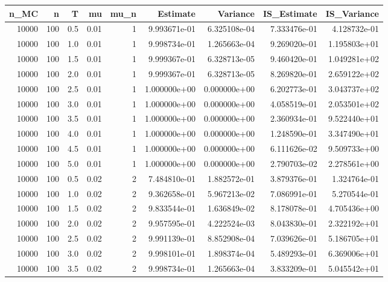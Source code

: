 \begin{tabular}{rrrrrrrrr}
\toprule
  n\_MC &    n &    T &    mu &  mu\_n &      Estimate &      Variance &   IS\_Estimate &   IS\_Variance \\
\midrule
 10000 &  100 &  0.5 &  0.01 &     1 &  9.993671e-01 &  6.325108e-04 &  7.333476e-01 &  4.128732e-01 \\
 10000 &  100 &  1.0 &  0.01 &     1 &  9.998734e-01 &  1.265663e-04 &  9.269020e-01 &  1.195803e+01 \\
 10000 &  100 &  1.5 &  0.01 &     1 &  9.999367e-01 &  6.328713e-05 &  9.460420e-01 &  1.049281e+02 \\
 10000 &  100 &  2.0 &  0.01 &     1 &  9.999367e-01 &  6.328713e-05 &  8.269820e-01 &  2.659122e+02 \\
 10000 &  100 &  2.5 &  0.01 &     1 &  1.000000e+00 &  0.000000e+00 &  6.202773e-01 &  3.043737e+02 \\
 10000 &  100 &  3.0 &  0.01 &     1 &  1.000000e+00 &  0.000000e+00 &  4.058519e-01 &  2.053501e+02 \\
 10000 &  100 &  3.5 &  0.01 &     1 &  1.000000e+00 &  0.000000e+00 &  2.360934e-01 &  9.522440e+01 \\
 10000 &  100 &  4.0 &  0.01 &     1 &  1.000000e+00 &  0.000000e+00 &  1.248590e-01 &  3.347490e+01 \\
 10000 &  100 &  4.5 &  0.01 &     1 &  1.000000e+00 &  0.000000e+00 &  6.111626e-02 &  9.509733e+00 \\
 10000 &  100 &  5.0 &  0.01 &     1 &  1.000000e+00 &  0.000000e+00 &  2.790703e-02 &  2.278561e+00 \\
 10000 &  100 &  0.5 &  0.02 &     2 &  7.484810e-01 &  1.882572e-01 &  3.879376e-01 &  1.324764e-01 \\
 10000 &  100 &  1.0 &  0.02 &     2 &  9.362658e-01 &  5.967213e-02 &  7.086991e-01 &  5.270544e-01 \\
 10000 &  100 &  1.5 &  0.02 &     2 &  9.833544e-01 &  1.636849e-02 &  8.178078e-01 &  4.705436e+00 \\
 10000 &  100 &  2.0 &  0.02 &     2 &  9.957595e-01 &  4.222524e-03 &  8.043830e-01 &  2.322192e+01 \\
 10000 &  100 &  2.5 &  0.02 &     2 &  9.991139e-01 &  8.852908e-04 &  7.039626e-01 &  5.186705e+01 \\
 10000 &  100 &  3.0 &  0.02 &     2 &  9.998101e-01 &  1.898374e-04 &  5.489293e-01 &  6.369006e+01 \\
 10000 &  100 &  3.5 &  0.02 &     2 &  9.998734e-01 &  1.265663e-04 &  3.833209e-01 &  5.045542e+01 \\

\end{tabular}
